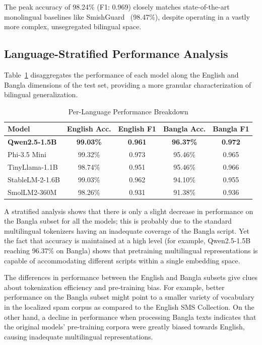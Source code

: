 \documentclass[journal]{IEEEtran}
\begin{document}
The peak accuracy of 98.24\% (F1: 0.969) closely matches state-of-the-art monolingual baselines like SmishGuard~\cite{ref6} (98.47\%), despite operating in a vastly more complex, unsegregated bilingual space.

\subsection{Language-Stratified Performance Analysis}

Table~\ref{tab:lang_results} disaggregates the performance of each model along the English
and Bangla dimensions of the test set, providing a more granular
characterization of bilingual generalization.

\begin{table}[htbp]
\caption{Per-Language Performance Breakdown}
\label{tab:lang_results}
\centering
\begin{tabular}{lcccc}
\toprule
\textbf{Model} & \textbf{English Acc.} & \textbf{English F1} & \textbf{Bangla Acc.} & \textbf{Bangla F1} \\
\midrule
\rowcolor{gray!20} \textbf{Qwen2.5-1.5B} & \textbf{99.03\%} & \textbf{0.961} & \textbf{96.37\%} & \textbf{0.972} \\
Phi-3.5 Mini & 99.32\% & 0.973 & 95.46\% & 0.965 \\
TinyLlama-1.1B & 98.74\% & 0.951 & 95.46\% & 0.966 \\
StableLM-2-1.6B & 99.03\% & 0.962 & 94.10\% & 0.955 \\
SmolLM2-360M & 98.26\% & 0.931 & 91.38\% & 0.936 \\
\bottomrule
\end{tabular}
\end{table}



A stratified analysis shows that there is only a slight decrease in performance on the Bangla subset for all the models; this is probably due to the standard multilingual tokenizers having an inadequate coverage of the Bangla script. Yet the fact that accuracy is maintained at a high level (for example, Qwen2.5-1.5B reaching 96.37\% on Bangla) shows that pretraining multilingual representations is capable of accommodating different scripts within a single embedding space.

The differences in performance between the English and Bangla subsets give clues about tokenization efficiency and pre-training bias. For example, better performance on the Bangla subset might point to a smaller variety of vocabulary in the localized spam corpus as compared to the English SMS Collection. On the other hand, a decline in performance when processing Bangla texts indicates that the original models' pre-training corpora were greatly biased towards English, causing inadequate multilingual representations.
\end{document}
